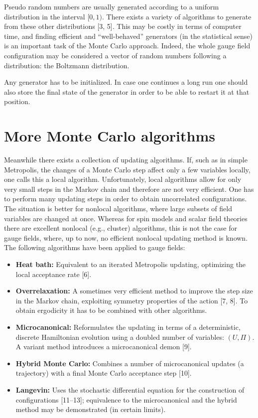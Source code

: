 Pseudo random numbers are usually generated according to a uniform distribution in the interval $[0,1)$. There exists a variety of algorithms to generate
from these other distributions [3, 5]. This may be costly in terms of computer
time, and finding efficient and ``well-behaved'' generators (in the statistical
sense) is an important task of the Monte Carlo approach. Indeed, the whole
gauge field configuration may be considered a vector of random numbers following a distribution: the Boltzmann distribution.

Any generator has to be initialized. In case one continues a long run one
should also store the final state of the generator in order to be able to restart
it at that position.

\section{More Monte Carlo algorithms}

Meanwhile there exists a collection of updating algorithms. If, such as in simple Metropolis, the changes of a Monte Carlo step affect only a few variables
locally, one calls this a local algorithm. Unfortunately, local algorithms allow for only very small steps in the Markov chain and therefore are not very
efficient. One has to perform many updating steps in order to obtain uncorrelated configurations. The situation is better for nonlocal algorithms, where
large subsets of field variables are changed at once. Whereas for spin models
and scalar field theories there are excellent nonlocal (e.g., cluster) algorithms,
this is not the case for gauge fields, where, up to now, no efficient nonlocal
updating method is known. The following algorithms have been applied to
gauge fields:

\begin{itemize}
  \item \textbf{Heat bath:} Equivalent to an iterated Metropolis updating, optimizing the
        local acceptance rate [6].
  \item \textbf{Overrelaxation:} A sometimes very efficient method to improve the step size
        in the Markov chain, exploiting symmetry properties of the action [7, 8].
        To obtain ergodicity it has to be combined with other algorithms.
  \item \textbf{Microcanonical:} Reformulates the updating in terms of a deterministic, discrete Hamiltonian evolution using a doubled number of variables: $(U, \Pi)$.
        A variant method introduces a microcanonical demon [9].
  \item \textbf{Hybrid Monte Carlo:} Combines a number of microcanonical updates (a
        trajectory) with a final Monte Carlo acceptance step [10].
  \item \textbf{Langevin:} Uses the stochastic differential equation for the construction of
        configurations [11--13]; equivalence to the microcanonical and the hybrid
        method may be demonstrated (in certain limits).
\end{itemize}

